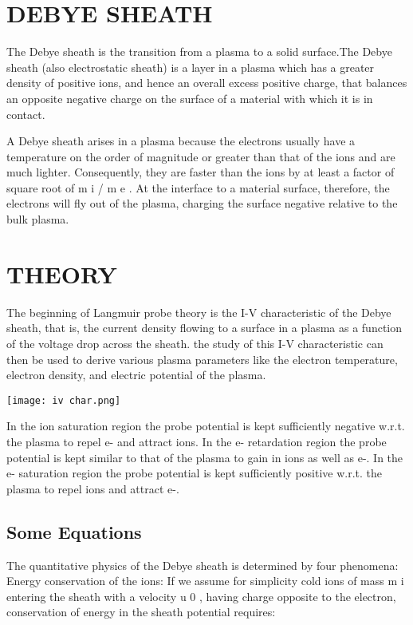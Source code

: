 \documentclass[12pt, a4paper, oneside]{book}
\begin{document}
	\section{DEBYE SHEATH}
	
	The Debye sheath is the transition from a plasma to a solid surface.The Debye sheath (also electrostatic sheath) is a layer in a plasma which has a greater density of positive ions, and hence an overall excess positive charge, that balances an opposite negative charge on the surface of a material with which it is in contact.
	
	A Debye sheath arises in a plasma because the electrons usually have a temperature on the order of magnitude or greater than that of the ions and are much lighter. Consequently, they are faster than the ions by at least a factor of square root of
	m i / m e  
	. At the interface to a material surface, therefore, the electrons will fly out of the plasma, charging the surface negative relative to the bulk plasma.
	 
	
	
	\section{THEORY}
The beginning of Langmuir probe theory is the I-V characteristic of the Debye sheath, that is, the current density flowing to a surface in a plasma as a function of the voltage drop across the sheath. the study of this I-V characteristic can then be used to derive various plasma parameters like the electron temperature, electron density, and electric potential of the plasma.

\texttt{[image: iv char.png]}

In the ion saturation region the probe potential is kept sufficiently negative w.r.t. the plasma to repel e- and attract ions.
In the e- retardation region the probe potential is kept similar to that of the plasma to gain in ions as well as e-.
In the e- saturation region the probe potential is kept sufficiently positive w.r.t. the plasma to repel ions and attract e-.

	\subsection{Some Equations}
	
The quantitative physics of the Debye sheath is determined by four phenomena:
Energy conservation of the ions: If we assume for simplicity cold ions of mass 
m i
entering the sheath with a velocity 
u 0 
, having charge opposite to the electron, conservation of energy in the sheath potential requires:
\end{document}
